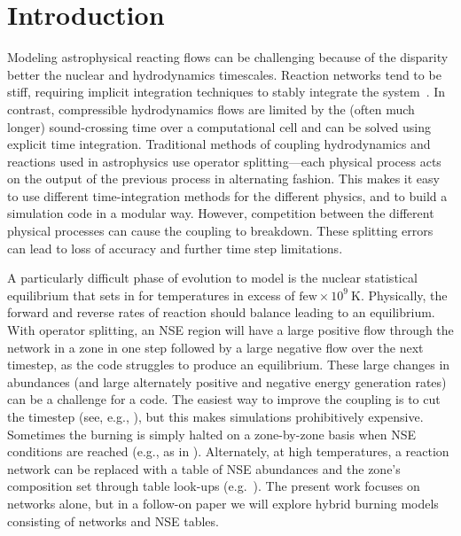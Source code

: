 \documentclass{aastex63}
\begin{document}

\section{Introduction}\label{Sec:Introduction}

Modeling astrophysical reacting flows can be challenging because of
the disparity better the nuclear and hydrodynamics timescales.
Reaction networks tend to be stiff, requiring implicit integration
techniques to stably integrate the system~\citep{BYRNE19871}.  In contrast, compressible
hydrodynamics flows are limited by the (often much longer)
sound-crossing time over a computational cell and can be solved using
explicit time integration. Traditional methods of coupling
hydrodynamics and reactions used in astrophysics use operator
splitting---each physical process acts on the output of the previous
process in alternating fashion.  This makes it easy to use different
time-integration methods for the different physics, and to build a
simulation code in a modular way.  However, competition between the
different physical processes can cause the coupling to breakdown.
These splitting errors can lead to loss of accuracy and further time
step limitations.

A particularly difficult phase of evolution to model is the nuclear
statistical equilibrium that sets in for temperatures in excess of
$\mbox{few} \times 10^9~\mathrm{K}$.  Physically, the forward and
reverse rates of reaction should balance leading to an equilibrium.
With operator splitting, an NSE region will have a large positive flow
through the network in a zone in one step followed by a large negative
flow over the next timestep, as the code struggles to produce an
equilibrium.  These large changes in abundances (and large alternately
positive and negative energy generation rates) can be a challenge for
a code.  The easiest way to improve the coupling is to cut the
timestep (see, e.g., \citealt{couch:2015}), but this makes simulations
prohibitively expensive.  Sometimes the burning is simply halted on a
zone-by-zone basis when NSE conditions are reached (e.g., as in
\citealt{hedet}).  Alternately, at high temperatures, a reaction
network can be replaced with a table of NSE abundances and the zone's
composition set through table look-ups (e.g.\ \citealt{ma:2013}).  The
present work focuses on networks alone, but in a follow-on paper we
will explore hybrid burning models consisting of networks and NSE
tables.
\end{document}
